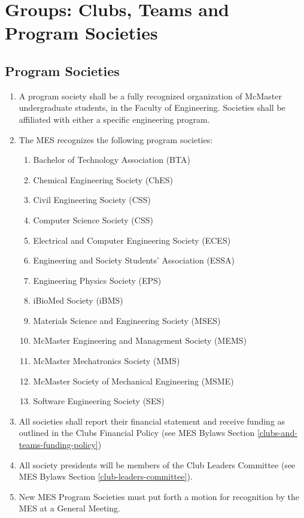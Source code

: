 \section{Groups: Clubs, Teams and Program Societies}
\label{groups-clubs-teams-and-program-societies}

\subsection{Program Societies}
\label{program-societies}
\begin{enumerate}
 \item
  A program society shall be a fully recognized organization of McMaster undergraduate students, in the Faculty of Engineering. Societies shall be affiliated with either a specific engineering program.
 \item
  The MES recognizes the following program societies:

  \begin{enumerate}
   \item
    Bachelor of Technology Association (BTA)
   \item
    Chemical Engineering Society (ChES)
   \item
    Civil Engineering Society (CSS)
   \item
    Computer Science Society (CSS)
   \item
    Electrical and Computer Engineering Society (ECES)
   \item
    Engineering and Society Students' Association (ESSA)
   \item
    Engineering Physics Society (EPS)
   \item
    iBioMed Society (iBMS)
   \item
    Materials Science and Engineering Society (MSES)
   \item
    McMaster Engineering and Management Society (MEMS)
   \item
    McMaster Mechatronics Society (MMS)
   \item
    McMaster Society of Mechanical Engineering (MSME)
   \item
    Software Engineering Society (SES)
  \end{enumerate}
 \item
  All societies shall report their financial statement and receive funding as outlined in the Clubs Financial Policy (see MES Bylaws Section \ref{clubs-and-teams-funding-policy})
 \item
  All society presidents will be members of the Club Leaders Committee (see MES Bylaws Section \ref{club-leaders-committee}).
 \item
  New MES Program Societies must put forth a motion for recognition by the MES at a General Meeting.

\end{enumerate}

